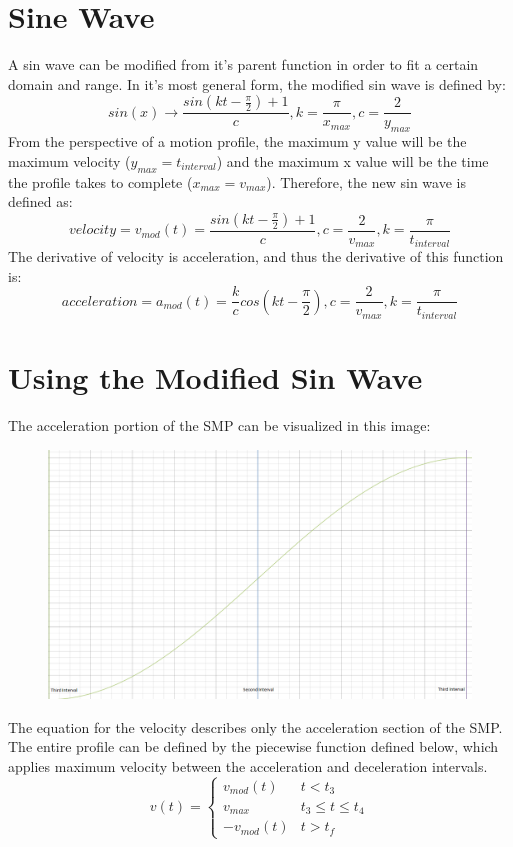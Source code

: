 \documentclass[a4paper,12pt]{report}
\newcommand{\tab}{\hspace{20pt}}
\begin{document}
	\section{Sine Wave}
	\tab A sin wave can be modified from it's parent function in order to fit a certain domain and range. In it's most general form, the modified sin wave is defined by:
	\[sin(x) \rightarrow \frac{sin(kt - \frac{\pi}{2}) + 1}{c}, k = \frac{\pi}{x_{max}}, c = \frac{2}{y_{max}}\]
	\tab From the perspective of a motion profile, the maximum y value will be the maximum velocity ($y_{max} = t_{interval}$) and the maximum x value will be the time the profile takes to complete ($x_{max} = v_{max}$). Therefore, the new sin wave is defined as:
	\[velocity = v_{mod}(t) = \frac{sin(kt - \frac{\pi}{2}) + 1}{c}, c = \frac{2}{v_{max}}, k = \frac{\pi}{t_{interval}}\]
	\tab The derivative of velocity is acceleration, and thus the derivative of this function is:
	\[acceleration = a_{mod}(t) = \frac{k}{c} cos(kt - \frac{\pi}{2}), c = \frac{2}{v_{max}}, k = \frac{\pi}{t_{interval}}\]
	
	\section{Using the Modified Sin Wave}
	\tab The acceleration portion of the SMP can be visualized in this image:
	\begin{figure}[h]
		\centering
		\includegraphics[scale=.3]{acceleration.png}
	\end{figure}
	
	\tab The equation for the velocity describes only the acceleration section of the SMP. The entire profile can be defined by the piecewise function defined below, which applies maximum velocity between the acceleration and deceleration intervals.
	\[v(t) = \begin{cases} 
	v_{mod}(t) & t < t_3  \\
	v_{max} & t_3 \leq t\leq t_4 \\
	-v_{mod}(t) & t > t_f
	\end{cases}\]
	
\end{document}
